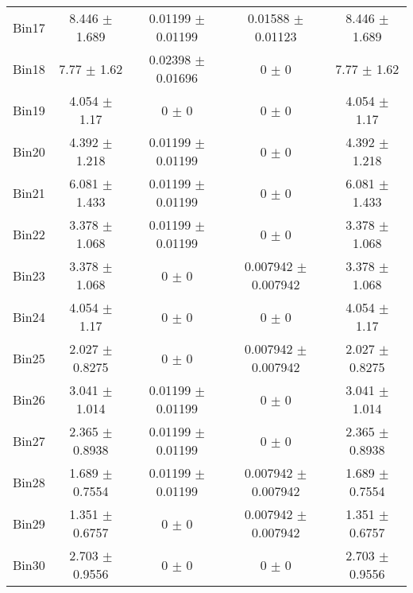 \begin{tabular}{@{\extracolsep{4pt}}lcccc@{}}
     Bin17 & 8.446 $\pm$ 1.689 & 0.01199 $\pm$ 0.01199 & 0.01588 $\pm$ 0.01123 & 8.446 $\pm$ 1.689 \\ 
     Bin18 & 7.77 $\pm$ 1.62 & 0.02398 $\pm$ 0.01696 & 0 $\pm$ 0 & 7.77 $\pm$ 1.62 \\ 
     Bin19 & 4.054 $\pm$ 1.17 & 0 $\pm$ 0 & 0 $\pm$ 0 & 4.054 $\pm$ 1.17 \\ 
     Bin20 & 4.392 $\pm$ 1.218 & 0.01199 $\pm$ 0.01199 & 0 $\pm$ 0 & 4.392 $\pm$ 1.218 \\ 
     Bin21 & 6.081 $\pm$ 1.433 & 0.01199 $\pm$ 0.01199 & 0 $\pm$ 0 & 6.081 $\pm$ 1.433 \\ 
     Bin22 & 3.378 $\pm$ 1.068 & 0.01199 $\pm$ 0.01199 & 0 $\pm$ 0 & 3.378 $\pm$ 1.068 \\ 
     Bin23 & 3.378 $\pm$ 1.068 & 0 $\pm$ 0 & 0.007942 $\pm$ 0.007942 & 3.378 $\pm$ 1.068 \\ 
     Bin24 & 4.054 $\pm$ 1.17 & 0 $\pm$ 0 & 0 $\pm$ 0 & 4.054 $\pm$ 1.17 \\ 
     Bin25 & 2.027 $\pm$ 0.8275 & 0 $\pm$ 0 & 0.007942 $\pm$ 0.007942 & 2.027 $\pm$ 0.8275 \\ 
     Bin26 & 3.041 $\pm$ 1.014 & 0.01199 $\pm$ 0.01199 & 0 $\pm$ 0 & 3.041 $\pm$ 1.014 \\ 
     Bin27 & 2.365 $\pm$ 0.8938 & 0.01199 $\pm$ 0.01199 & 0 $\pm$ 0 & 2.365 $\pm$ 0.8938 \\ 
     Bin28 & 1.689 $\pm$ 0.7554 & 0.01199 $\pm$ 0.01199 & 0.007942 $\pm$ 0.007942 & 1.689 $\pm$ 0.7554 \\ 
     Bin29 & 1.351 $\pm$ 0.6757 & 0 $\pm$ 0 & 0.007942 $\pm$ 0.007942 & 1.351 $\pm$ 0.6757 \\ 
     Bin30 & 2.703 $\pm$ 0.9556 & 0 $\pm$ 0 & 0 $\pm$ 0 & 2.703 $\pm$ 0.9556 \\ 
\hline\hline
  \end{tabular}
